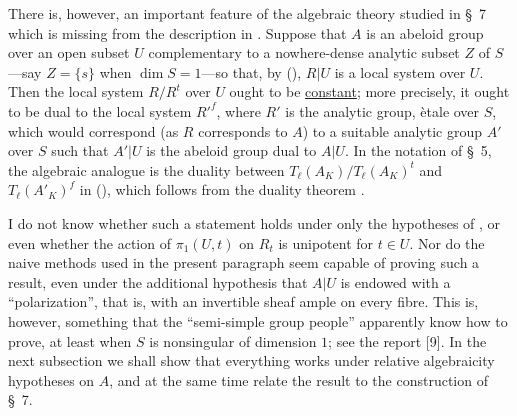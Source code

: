 There is, however, an important feature of the algebraic theory studied
in \S~7 which is missing from the description in .  Suppose that
$A$ is an abeloid group over an open subset $U$ complementary to a
nowhere-dense analytic subset $Z$ of $S$---say $Z=\{s\}$ when
$\dim S=1$---so that, by (), $R|U$ is a local system over $U$.
Then the local system $R/R^t$ over $U$ ought to be \underline{constant};
more precisely, it ought to be dual to the local system ${R'}^f$, where
$R'$ is the analytic group, \`etale over $S$, which would correspond
(as $R$ corresponds to $A$) to a suitable analytic group $A'$ over $S$
such that $A'|U$ is the abeloid group dual to $A|U$.  In the notation of
\S~5, the algebraic analogue is the duality between
$T_\ell(A_K)/T_\ell(A_K)^t$ and $T_\ell(A'_K)^f$ in (), which
follows from the duality theorem .

I do not know whether such a statement holds under only the hypotheses
of , or even whether the action of $\pi_1(U,t)$ on $R_t$ is
unipotent for $t\in U$.  Nor do the naive methods used in the present
paragraph seem capable of proving such a result, even under the
additional hypothesis that $A|U$ is endowed with a ``polarization'',
that is, with an invertible sheaf ample on every fibre.  This is,
however, something that the ``semi-simple group people'' apparently know
how to prove, at least when $S$ is nonsingular of dimension $1$; see the
report [9].  In the next subsection we shall show that everything works
under relative algebraicity hypotheses on $A$, and at the same time
relate the result to the construction of \S~7.
